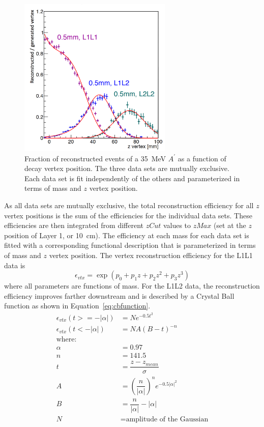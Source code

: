 \begin{figure}[htb]
  \centering
      \includegraphics[width=0.65\textwidth]{pics/searching/reconstructedVtx.png}
  \caption[Fraction of reconstructed events of a 35~MeV $A^{\prime}$ as a function of decay vertex position]{Fraction of reconstructed events of a 35~MeV $A^{\prime}$ as a function of decay vertex position. The three data sets are mutually exclusive. Each data set is fit independently of the others and parameterized in terms of mass and $z$ vertex position. }
  \label{fig:apEff}
\end{figure} 
As all data sets are mutually exclusive, the total reconstruction efficiency for all $z$ vertex positions is the sum of the efficiencies for the individual data sets. These efficiencies are then integrated from different $zCut$ values to $zMax$ (set at the $z$ position of Layer 1, or 10~cm). The efficiency at each mass for each data set is fitted with a corresponding functional description that is parameterized in terms of mass and $z$ vertex position. The vertex reconstruction efficiency for the L1L1 data is 
\begin{equation}
\label{eq:promptfunction}
\epsilon_{vtx} = \exp(p_0+p_1z+p_2z^2+p_3z^3) 
\end{equation}
where all parameters are functions of mass. For the L1L2 data, the reconstruction efficiency improves farther downstream and is described by a Crystal Ball function as shown in Equation~\eqref{eq:cbfunction}.
\begin{equation}
\begin{split}
\label{eq:cbfunction}
\epsilon_{vtx}(t >= -| \alpha |) & = N e^{-0.5t^{2}}\\
\epsilon_{vtx}(t < -| \alpha |) & = N A(B-t)^{-n}\\
\textrm{where:}\\
\alpha & = 0.97\\
n & = 141.5\\
t & = \dfrac{z-z_{mean}}{\sigma}\\
A & = (\dfrac{n}{| \alpha |})^{n}e^{-0.5 |\alpha |^2}\\
B & = \dfrac{n}{| \alpha |}-|\alpha | \\
N & = \textrm{amplitude of the Gaussian}
\end{split}
\end{equation}
